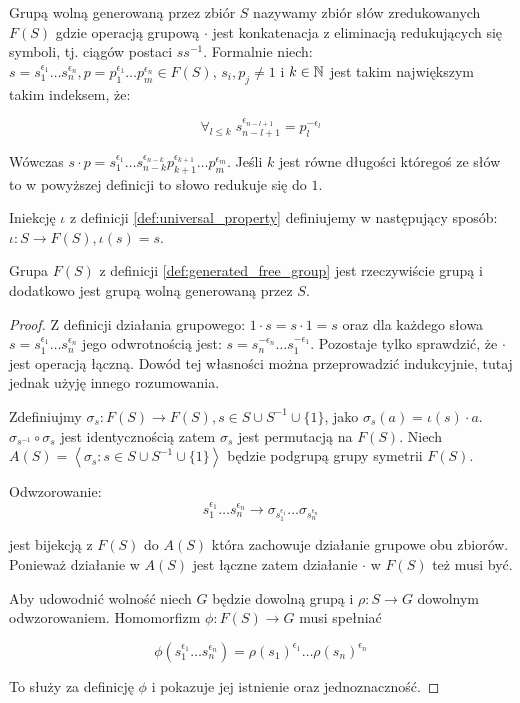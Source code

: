 \begin{defin}
  Grupą wolną generowaną przez zbiór $S$ nazywamy zbiór słów zredukowanych
  $F(S)$ gdzie operacją grupową $\cdot$ jest konkatenacja z eliminacją
  redukujących się symboli, tj. ciągów postaci $ss^{-1}$. Formalnie niech:
  $s = s_1^{\epsilon_1}\ldots s_n^{\epsilon_n}, p = p_1^{\epsilon_1}\ldots
  p_m^{\epsilon_n} \in F(S)$, $s_i, p_j \neq 1$ i $k \in \mathbb{N}$ jest takim
  największym takim indeksem, że:

  \[\forall_{l \leq k} \; s_{n - l + 1}^{\epsilon_{n - l + 1}} =
    p_l^{-\epsilon_l}\]

  Wówczas $s \cdot p = s_1^{\epsilon_1}\ldots s_{n -
  k}^{\epsilon_{n-k}}p_{k+1}^{\epsilon_{k+1}}\ldots p_{m}^{\epsilon_m}$. Jeśli
  $k$ jest równe długości któregoś ze słów to w powyższej definicji to słowo
  redukuje się do $1$.

  Iniekcję $\iota$ z definicji \ref{def:universal_property} definiujemy w
  następujący sposób: $\iota: S \rightarrow F(S), \iota(s) = s$.
  \label{def:generated_free_group}
\end{defin}

\begin{theorem}
  Grupa $F(S)$ z definicji \ref{def:generated_free_group} jest rzeczywiście grupą
  i dodatkowo jest grupą wolną generowaną przez $S$.
\end{theorem}
\begin{proof}
  Z definicji działania grupowego: $1 \cdot s = s \cdot 1 = s$ oraz
  dla każdego słowa
  $s = s_1^{\epsilon_1}\ldots s_n^{\epsilon_n}$
  jego odwrotnością jest:
  $s = s_n^{-\epsilon_n}\ldots s_1^{-\epsilon_1}$. Pozostaje tylko sprawdzić, że
  $\cdot$ jest operacją łączną. Dowód tej własności można przeprowadzić
  indukcyjnie, tutaj jednak użyję innego rozumowania.

  Zdefiniujmy $\sigma_s: F(S) \rightarrow F(S), s \in S \cup S^{-1} \cup \{1\}$,
  jako $\sigma_s(a) = \iota(s) \cdot a$. $\sigma_{s^{-1}} \circ \sigma_{s}$ jest
  identycznością zatem $\sigma_{s}$ jest permutacją na $F(S)$. Niech
  $A(S) = \left\langle \sigma_s : s \in S \cup S^{-1} \cup \{1\}\right\rangle$
  będzie podgrupą grupy symetrii $F(S)$.

  Odwzorowanie:
  \[
    s_1^{\epsilon_1} \ldots
    s_n^{\epsilon_n} \rightarrow
    \sigma_{s_1^{\epsilon_1}} \ldots
    \sigma_{s_n^{\epsilon_n}}
  \]

  jest bijekcją z $F(S)$ do $A(S)$ która zachowuje działanie grupowe obu
  zbiorów.
  Ponieważ działanie w $A(S)$ jest łączne zatem działanie $\cdot$ w
  $F(S)$ też musi być.

  Aby udowodnić wolność niech $G$ będzie dowolną grupą i $\rho: S \rightarrow G$
  dowolnym odwzorowaniem. Homomorfizm $\phi: F(S) \rightarrow G$ musi spełniać

  \[ \phi\left(s_1^{\epsilon_1} \ldots s_n^{\epsilon_n}\right) =
  \rho\left(s_1\right)^{\epsilon_1} \ldots \rho\left(s_n\right)^{\epsilon_n}\]

  To służy za definicję $\phi$ i pokazuje jej istnienie oraz jednoznaczność.
\end{proof}

